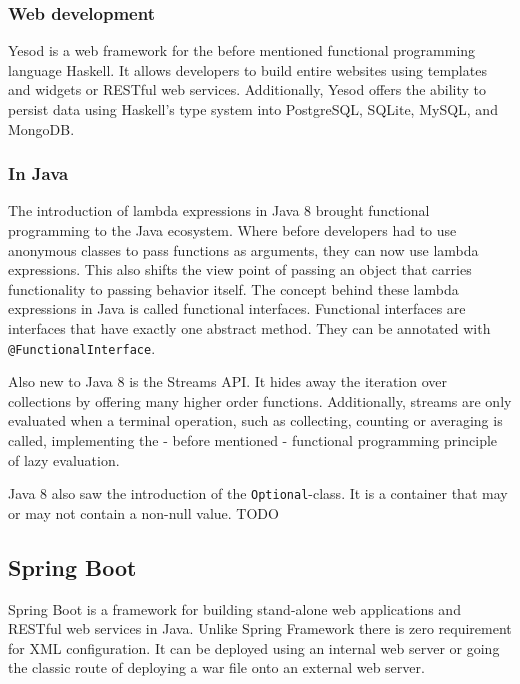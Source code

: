 \documentclass[a4paper]{article}
\begin{document}
\subsubsection{Web development}

Yesod is a web framework for the before mentioned functional programming
language Haskell. It allows developers to build entire websites using templates
and widgets or RESTful web services. Additionally, Yesod offers the ability to
persist data using Haskell's type system into PostgreSQL, SQLite, MySQL, and
MongoDB. \cite{snoyman2015developing}

\subsubsection{In Java}

The introduction of lambda expressions in Java 8 brought functional programming
to the Java ecosystem. Where before developers had to use anonymous classes to
pass functions as arguments, they can now use lambda expressions. This also
shifts the view point of passing an object that carries functionality to passing
behavior itself. The concept behind these lambda expressions in Java is called
functional interfaces. Functional interfaces are interfaces that have exactly
one abstract method. They can be annotated with \verb|@FunctionalInterface|.
\newline

\noindent Also new to Java 8 is the Streams API. It hides away the iteration
over collections by offering many higher order functions. Additionally, streams
are only evaluated when a terminal operation, such as collecting, counting or
averaging is called, implementing the - before mentioned - functional
programming principle of lazy evaluation. \cite{warburton2014java}

Java 8 also saw the introduction of the \verb|Optional|-class. It is a container
that may or may not contain a non-null value. TODO

\subsection{Spring Boot}

Spring Boot is a framework for building stand-alone web applications and RESTful
web services in Java. Unlike Spring Framework there is zero requirement for XML
configuration. It can be deployed using an internal web server or going the
classic route of deploying a war file onto an external web server.
\cite{webb2013spring}
\end{document}

